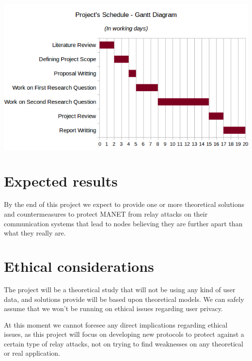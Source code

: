 \documentclass{article}
\begin{document}
\begin{center}
\includegraphics[scale=0.7]{images/gantt.png}\\[1cm]
\end{center}

\section{Expected results}

By the end of this project we expect to provide one or more theoretical solutions and countermeasures to protect MANET from relay attacks on their communication systems that lead to nodes believing they are further apart than what they really are.

\section{Ethical considerations}

The project will be a theoretical study that will not be using any kind of user data, and solutions provide will be based upon theoretical models. We can safely assume that we won't be running on ethical issues regarding user privacy.

At this moment we cannot foresee any direct implications regarding ethical issues, as this project will focus on developing new protocols to protect against a certain type of relay attacks, not on trying to find weaknesses on any theoretical or real application.

\printbibliography
\end{document}

